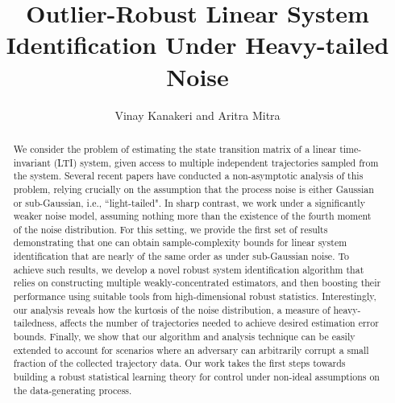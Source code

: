 \documentclass[letterpaper, 11 pt]{article}
\date{}
\title{\LARGE Outlier-Robust Linear System Identification Under Heavy-tailed Noise}
\author{Vinay Kanakeri and Aritra Mitra} %
\begin{document}
\maketitle
{}
\begin{abstract}%
 We consider the problem of estimating the state transition matrix of a linear time-invariant (LTI) system, given access to multiple independent trajectories sampled from the system. Several recent papers have conducted a non-asymptotic analysis of this problem, relying crucially on the assumption that the process noise is either Gaussian or sub-Gaussian, i.e., ``light-tailed". In sharp contrast, we work under a significantly weaker noise model, assuming nothing more than the existence of the fourth moment of the noise distribution. For this setting, we provide the first set of results demonstrating that one can obtain sample-complexity bounds for linear system identification that are nearly of the same order as under sub-Gaussian noise. To achieve such results, we develop a novel robust system identification algorithm that relies on constructing multiple weakly-concentrated estimators, and then boosting their performance using suitable tools from high-dimensional robust statistics. Interestingly,  our analysis reveals how the kurtosis of the noise distribution, a measure of heavy-tailedness, affects the number of trajectories needed to achieve desired estimation error bounds. Finally, we show that our algorithm and analysis technique can be easily extended to account for scenarios where an adversary can arbitrarily corrupt a small fraction of the collected trajectory data.  Our work takes the first steps towards building a robust statistical learning theory for control under non-ideal assumptions on the data-generating process. 
\end{abstract}
\end{document}
